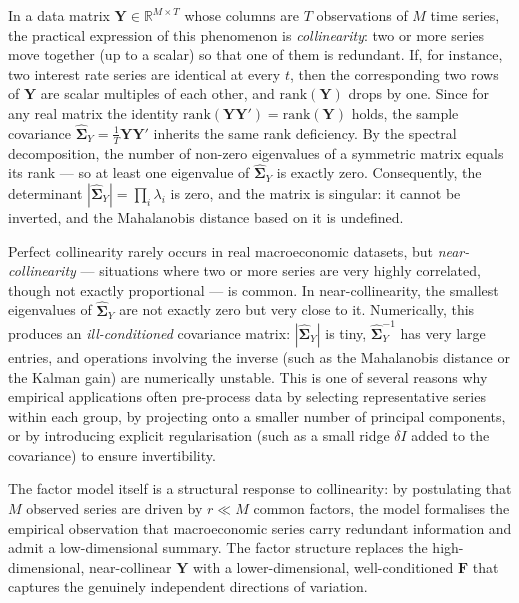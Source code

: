 \documentclass[11pt, a4paper, oneside]{article}
\begin{document}
In a data matrix $\mathbf{Y} \in \mathbb{R}^{M \times T}$ whose
columns are $T$ observations of $M$ time series, the practical
expression of this phenomenon is \emph{collinearity}: two or more
series move together (up to a scalar) so that one of them is
redundant. If, for instance, two interest rate series are
identical at every $t$, then the corresponding two rows of
$\mathbf{Y}$ are scalar multiples of each other, and
$\mathrm{rank}(\mathbf{Y})$ drops by one. Since for any real matrix
the identity $\mathrm{rank}(\mathbf{Y} \mathbf{Y}') = \mathrm{rank}(\mathbf{Y})$
holds, the sample covariance
$\widehat{\boldsymbol{\Sigma}}_Y = \tfrac{1}{T}\mathbf{Y}\mathbf{Y}'$
inherits the same rank deficiency. By the spectral decomposition,
the number of non-zero eigenvalues of a symmetric matrix equals its
rank — so at least one eigenvalue of
$\widehat{\boldsymbol{\Sigma}}_Y$ is exactly zero. Consequently, the
determinant $|\widehat{\boldsymbol{\Sigma}}_Y| = \prod_i \lambda_i$
is zero, and the matrix is singular: it cannot be inverted, and the
Mahalanobis distance based on it is undefined.

Perfect collinearity rarely occurs in real macroeconomic datasets,
but \emph{near-collinearity} — situations where two or more series
are very highly correlated, though not exactly proportional — is
common. In near-collinearity, the smallest eigenvalues of
$\widehat{\boldsymbol{\Sigma}}_Y$ are not exactly zero but very
close to it. Numerically, this produces an \emph{ill-conditioned}
covariance matrix: $|\widehat{\boldsymbol{\Sigma}}_Y|$ is tiny,
$\widehat{\boldsymbol{\Sigma}}_Y^{-1}$ has very large entries, and
operations involving the inverse (such as the Mahalanobis distance
or the Kalman gain) are numerically unstable. This is one of several
reasons why empirical applications often pre-process data by
selecting representative series within each group, by projecting
onto a smaller number of principal components, or by introducing
explicit regularisation (such as a small ridge $\delta I$ added to
the covariance) to ensure invertibility.

The factor model itself is a structural response to collinearity: by
postulating that $M$ observed series are driven by $r \ll M$ common
factors, the model formalises the empirical observation that
macroeconomic series carry redundant information and admit a
low-dimensional summary. The factor structure replaces the
high-dimensional, near-collinear $\mathbf{Y}$ with a
lower-dimensional, well-conditioned $\mathbf{F}$ that captures the
genuinely independent directions of variation.
\end{document}
